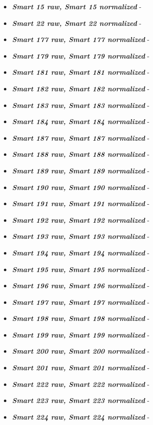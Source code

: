 \documentclass{VUMIFPSkursinis}
\begin{document}
\begin{itemize}
\item \textit{\textbf{Smart 15 raw, Smart 15 normalized}} - 
\item \textit{\textbf{Smart 22 raw, Smart 22 normalized}} - 
\item \textit{\textbf{Smart 177 raw, Smart 177 normalized}} - 
\item \textit{\textbf{Smart 179 raw, Smart 179 normalized}} - 
\item \textit{\textbf{Smart 181 raw, Smart 181 normalized}} - 
\item \textit{\textbf{Smart 182 raw, Smart 182 normalized}} - 
\item \textit{\textbf{Smart 183 raw, Smart 183 normalized}} - 
\item \textit{\textbf{Smart 184 raw, Smart 184 normalized}} - 
\item \textit{\textbf{Smart 187 raw, Smart 187 normalized}} - 
\item \textit{\textbf{Smart 188 raw, Smart 188 normalized}} - 
\item \textit{\textbf{Smart 189 raw, Smart 189 normalized}} - 
\item \textit{\textbf{Smart 190 raw, Smart 190 normalized}} - 
\item \textit{\textbf{Smart 191 raw, Smart 191 normalized}} - 
\item \textit{\textbf{Smart 192 raw, Smart 192 normalized}} - 
\item \textit{\textbf{Smart 193 raw, Smart 193 normalized}} - 
\item \textit{\textbf{Smart 194 raw, Smart 194 normalized}} - 
\item \textit{\textbf{Smart 195 raw, Smart 195 normalized}} - 
\item \textit{\textbf{Smart 196 raw, Smart 196 normalized}} - 
\item \textit{\textbf{Smart 197 raw, Smart 197 normalized}} - 
\item \textit{\textbf{Smart 198 raw, Smart 198 normalized}} - 
\item \textit{\textbf{Smart 199 raw, Smart 199 normalized}} - 
\item \textit{\textbf{Smart 200 raw, Smart 200 normalized}} - 
\item \textit{\textbf{Smart 201 raw, Smart 201 normalized}} - 
\item \textit{\textbf{Smart 222 raw, Smart 222 normalized}} - 
\item \textit{\textbf{Smart 223 raw, Smart 223 normalized}} - 
\item \textit{\textbf{Smart 224 raw, Smart 224 normalized}} - 

\end{itemize}
\end{document}
